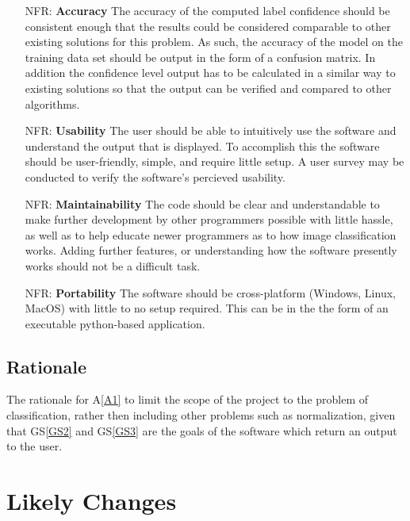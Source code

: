 \documentclass[12pt]{article}
\newcommand{\aref}[1]{A\ref{#1}}
\newcommand{\gsref}[1]{GS\ref{#1}}
\newcounter{nfrnum} %
\begin{document}
\noindent \begin{itemize}

\item[NFR\refstepcounter{nfrnum}\thenfrnum \label{NFR1}:]
  \textbf{Accuracy} The accuracy of the computed label confidence should be consistent enough that the results 
  could be considered comparable to other existing solutions for this problem. As such, the accuracy of the model
  on the training data set should be output in the form of a confusion matrix. In addition the confidence level output has to
  be calculated in a similar way to existing solutions so that the output can be verified and compared to other algorithms.

\item[NFR\refstepcounter{nfrnum}\thenfrnum \label{NFR2}:] \textbf{Usability}
  The user should be able to intuitively use the software and understand the output that is displayed.
  To accomplish this the software should be user-friendly, simple, and require little setup. A user survey
  may be conducted to verify the software's percieved usability.

\item[NFR\refstepcounter{nfrnum}\thenfrnum \label{NFR3}:]
  \textbf{Maintainability} The code should be clear and understandable to make further development by other programmers 
  possible with little hassle, as well as to help educate newer programmers as to how image classification works.
  Adding further features, or understanding how the software presently works should not be a difficult task.


\item[NFR\refstepcounter{nfrnum}\thenfrnum \label{NFR4}:]
  \textbf{Portability} The software should be cross-platform (Windows, Linux, MacOS) with little to no setup
  required. This can be in the the form of an executable python-based application.

\end{itemize}

\subsection{Rationale}

The rationale for \aref{A1} to limit the scope of the project to the problem of classification, rather then including
other problems such as normalization, given that \gsref{GS2} and \gsref{GS3} are the goals of the software which return an output
to the user.

\section{Likely Changes}
\end{document}
